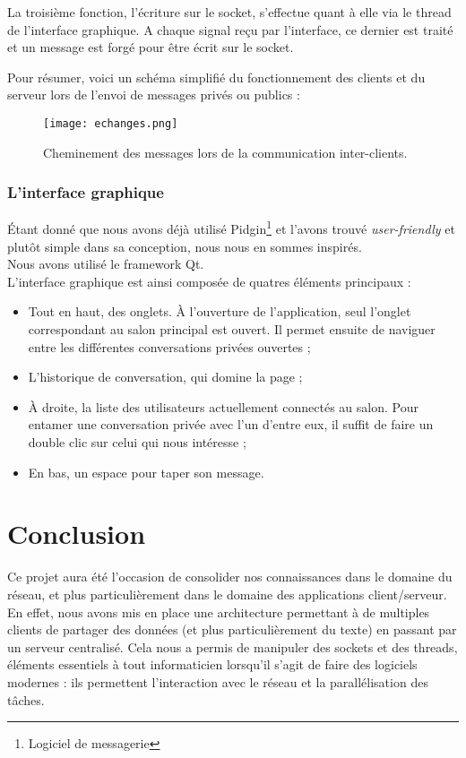 			La troisième fonction, l'écriture sur le socket, s'effectue quant à elle via le thread de l'interface graphique. A chaque signal reçu par l'interface, ce dernier est traité et un message est forgé pour être écrit sur le socket.
	
			\newpage
			Pour résumer, voici un schéma simplifié du fonctionnement des clients et du serveur lors de l'envoi de messages privés ou publics :
		
			\begin{figure}[h!]
				\centering
				\texttt{[image: echanges.png]}
				\caption{Cheminement des messages lors de la communication inter-clients.}
			\end{figure}
			\FloatBarrier
		
	
	
		\subsection{L'interface graphique}
			Étant donné que nous avons déjà utilisé Pidgin\footnote{Logiciel de messagerie} et l'avons trouvé \emph{user-friendly} et plutôt simple dans sa conception, nous nous en sommes inspirés.\\
			
			Nous avons utilisé le framework Qt.\\
			
			L'interface graphique est ainsi composée de quatres éléments principaux :
			\begin{itemize}
				\item Tout en haut, des onglets. À l'ouverture de l'application, seul l'onglet correspondant au salon principal est ouvert. Il permet ensuite de naviguer entre les différentes conversations privées ouvertes ;
				\item L'historique de conversation, qui domine la page ;
				\item À droite, la liste des utilisateurs actuellement connectés au salon. Pour entamer une conversation privée avec l'un d'entre eux, il suffit de faire un double clic sur celui qui nous intéresse ;
				\item En bas, un espace pour taper son message.
			\end{itemize}
			
			
			

\chapter*{Conclusion}
	Ce projet aura été l'occasion de consolider nos connaissances dans le domaine du réseau, et plus particulièrement dans le domaine des applications client/serveur. En effet, nous avons mis en place une architecture permettant à de multiples clients de partager des données (et plus particulièrement du texte) en passant par un serveur centralisé. Cela nous a permis de manipuler des sockets et des threads, éléments essentiels à tout informaticien lorsqu'il s'agit de faire des logiciels modernes : ils permettent l'interaction avec le réseau et la parallélisation des tâches.
	

